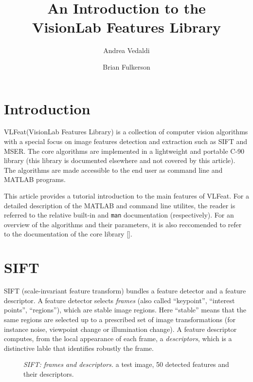\documentclass{article}
\title{An Introduction to the\\ VisionLab Features Library}
\author{Andrea Vedaldi \and Brian Fulkerson}
\newcommand{\VLFeat}{{\sc VLFeat}\xspace}
\begin{document}

\ifpdf\twocolumn\fi
\maketitle{}
\ifpdf\tableofcontents{}\fi

\section{Introduction}\label{intro}

\VLFeat (VisionLab Features Library) is a collection of computer
vision algorithms with a special focus on image features detection and
extraction such as SIFT and MSER. The core algorithms are implemented
in a lightweight and portable C-90 library (this library is documented
elsewhere and not covered by this article). The algorithms are made
accessible to the end user as command line and MATLAB programs.

This article provides a tutorial introduction to the main features of
\VLFeat. For a detailed description of the MATLAB and command line
utilites, the reader is referred to the relative built-in and
\verb$man$ documentation (respectively). For an overview of the
algorithms and their parameters, it is also reccomended to refer to
the documentation of the core library [].

\section{SIFT}\label{sift}

SIFT (scale-invariant feature transform) bundles a feature detector
and a feature descriptor. A feature detector selects {\em frames}
(also called ``keypoint'', ``interest points'', ``regions''), which
are stable image regions. Here ``stable'' means that the same regions
are selected up to a prescribed set of image transformations (for
instance noise, viewpoint change or illumination change). A feature
descriptor computes, from the local appearance of each frame, a {\em
  descriptors}, which is a distinctive lable that identifies robustly
the frame.

\begin{figure*}
\hfill
{}
\hfill
{}
\caption{{\em SIFT: frames and descriptors.} \protect{}
  a test image, \protect{} 50 detected features
  \protect{} and their
  descriptors.}\label{fig:sift-intro}
\end{figure*}
\end{document}
